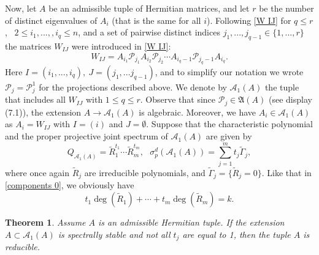 \documentclass[draft, 12pt, reqno]{amsart}
\numberwithin{equation}{section}
\theoremstyle{plain}
\newtheorem{theorem}{Theorem}[section]
\begin{document}
\vspace{.2cm}

Now, let $A$ be an admissible tuple of Hermitian matrices, and let $r$ be the number of distinct eigenvalues of $A_i$ (that is the same for all $i$).  
Following \eqref{W IJ} for 
$q\leq r$, \  $2\leq i_1,...,,i_q\leq  n$, and a set of pairwise distinct indices $j_1,...,j_{q-1}\in \{1,...,r\}$  the matrices $W_{IJ}$ were introduced in \eqref{W IJ}:
$$W_{IJ} = A_{i_1}\mathcal{P}_{j_1}A_{i_2}\mathcal{P}_{j_2}\cdots A_{i_q-1}\mathcal{P}_{j_q-1}A_{i_q}.$$
Here $I=(i_1,...,i_q), \ J=(j_1,...j_{q-1})$, and to simplify our notation we wrote $\mathcal{P}_j=\mathcal{P}_j^1$ for the projections described above.  
We denote by $\mathcal{A}_1(A)$ the tuple that includes all $W_{IJ}$ with $1\leq q\leq r$. Observe that since ${\mathcal P}_j\in \mathfrak{A}(A)$ (see display (7.1)), the extension $A\to \mathcal{A}_1(A)$ is algebraic. Moreover, we have $A_i\in \mathcal{A}_1(A)$ as $A_i=W_{IJ}$ with $I=(i)$ and $J=\emptyset$. Suppose that the characteristic polynomial and the proper projective joint spectrum of $\mathcal{A}_1(A)$ are given by
\begin{equation}\label{characteristic and spectrum 3}
Q_{\mathcal{A}_1(A)}= \widetilde{R}_1 ^{t_1}\cdots \widetilde{R}_m^{t_m}, \ \ \ \sigma_p^d(\mathcal{A}_1(A))=\displaystyle \sum_{j=1}^m t_j\widetilde{\Gamma}_j,
\end{equation}
where once again $\widetilde{R}_j$ are irreducible polynomials, and $\widetilde{\Gamma}_j= \{\widetilde{R}_j=0\}$. Like that in \eqref{components 0}, we obviously have
$$t_1 \deg(\widetilde{R}_1)+ \cdots +t_m \deg (\widetilde{R}_m)=k. $$


\vspace{.2cm}
 

\begin{theorem}\label{repeated multiplicities not 1}
Assume $A$ is an admissible Hermitian tuple. If the extension $A\subset \mathcal{A}_1(A)$ is spectrally stable and not all $t_j$ are equal to 1, then the tuple $A$ is reducible. 
\end{theorem}
\end{document}
